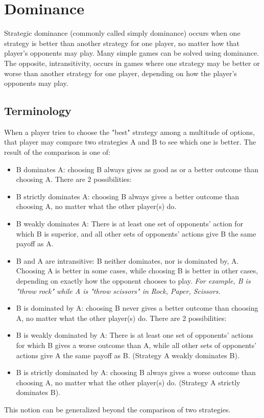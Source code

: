 \documentclass[]{report}
\begin{document}
\section{Dominance}

Strategic dominance (commonly called simply dominance) occurs when one strategy is better than another strategy for one player, no matter how that player's opponents may play. Many simple games can be solved using dominance. The opposite, intransitivity, occurs in games where one strategy may be better or worse than another strategy for one player, depending on how the player's opponents may play.


\subsection{Terminology}
When a player tries to choose the "best" strategy among a multitude of options, that player may compare two strategies A and B to see which one is better. The result of the comparison is one of:


\begin{itemize}
\item B dominates A: choosing B always gives as good as or a better outcome than choosing A. There are 2 possibilities:
\item B strictly dominates A: choosing B always gives a better outcome than choosing A, no matter what the other player(s) do.
\item B weakly dominates A: There is at least one set of opponents' action for which B is superior, and all other sets of opponents' actions give B the same payoff as A.
\item B and A are intransitive: B neither dominates, nor is dominated by, A. Choosing A is better in some cases, while choosing B is better in other cases, depending on exactly how the opponent chooses to play. \textit{For example, B is "throw rock" while A is "throw scissors" in Rock, Paper, Scissors.}
\item B is dominated by A: choosing B never gives a better outcome than choosing A, no matter what the other player(s) do. There are 2 possibilities:
\item B is weakly dominated by A: There is at least one set of opponents' actions for which B gives a worse outcome than A, while all other sets of opponents' actions give A the same payoff as B. (Strategy A weakly dominates B).
\item B is strictly dominated by A: choosing B always gives a worse outcome than choosing A, no matter what the other player(s) do. (Strategy A strictly dominates B).
\end{itemize}
This notion can be generalized beyond the comparison of two strategies.
\end{document}
